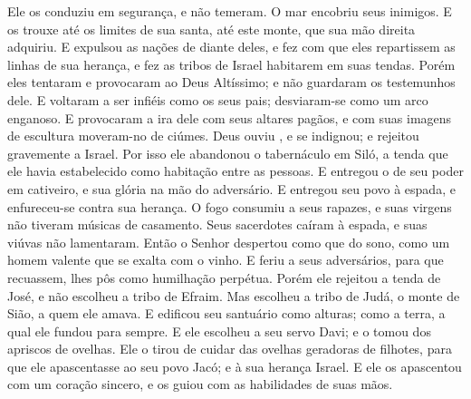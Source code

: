 {Ele os conduziu em segurança, e não temeram. O mar encobriu seus inimigos.
E os trouxe até os limites de sua
{} santa, até este monte, que sua mão direita adquiriu.
E expulsou as nações de diante deles, e fez com que eles repartissem as linhas de sua herança, e fez as tribos de Israel habitarem em suas tendas.
Porém eles tentaram e provocaram ao Deus Altíssimo; e não guardaram os testemunhos dele.
E voltaram a ser
{} infiéis como os seus pais; desviaram-se como um arco enganoso.
E provocaram a ira dele com seus altares pagãos,
 e com suas imagens de escultura moveram-no de ciúmes.
Deus ouviu
{} , e se indignou; e rejeitou gravemente a Israel.
Por isso ele abandonou o tabernáculo em Siló, a tenda que ele havia estabelecido como habitação entre as pessoas.
E entregou o
{} de seu poder em cativeiro, e sua glória na mão do adversário.
E entregou seu povo à espada, e enfureceu-se contra sua herança.
O fogo consumiu a seus rapazes, e suas virgens não tiveram músicas de casamento.
Seus sacerdotes caíram à espada, e suas viúvas não lamentaram.
Então o Senhor despertou como que do sono, como um homem valente que se exalta com o vinho.
E feriu a seus adversários, para que recuassem,
{} lhes pôs como humilhação perpétua.
Porém ele rejeitou a tenda de José, e não escolheu a tribo de Efraim.
Mas escolheu a tribo de Judá, o monte de Sião, a quem ele amava.
E edificou seu santuário como alturas; como a terra, a qual ele fundou para sempre.
E ele escolheu a seu servo Davi; e o tomou dos apriscos de ovelhas.
Ele o tirou de cuidar das ovelhas geradoras de filhotes, para que ele apascentasse ao seu povo Jacó; e à sua herança Israel.
E ele os apascentou com um coração sincero, e os guiou com as habilidades de suas mãos.

}
